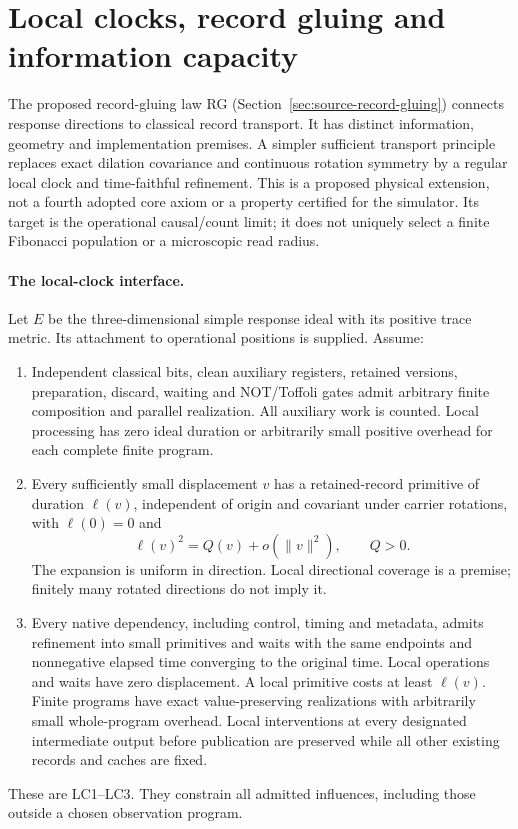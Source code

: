 \section{Local clocks, record gluing and information capacity}
\label{app:record-gluing-principle}

The proposed record-gluing law RG (Section~\ref{sec:source-record-gluing})
connects response directions to classical record transport. It has distinct information, geometry and implementation
premises. A simpler sufficient transport principle replaces exact dilation
covariance and continuous rotation symmetry by a regular local clock and
time-faithful refinement. This is a proposed physical extension, not a fourth
adopted core axiom or a property certified for the simulator. Its target is
the operational causal/count limit; it does not uniquely select a finite
Fibonacci population or a microscopic read radius.

\paragraph{The local-clock interface.}
Let $E$ be the three-dimensional simple response ideal with its positive
trace metric. Its attachment to operational positions is supplied. Assume:
\begin{enumerate}
\item Independent classical bits, clean auxiliary registers, retained
versions, preparation, discard, waiting and NOT/Toffoli gates admit
arbitrary finite composition and parallel realization. All auxiliary work
is counted. Local processing has zero ideal duration or arbitrarily small
positive overhead for each complete finite program.
\item Every sufficiently small displacement $v$ has a retained-record
primitive of duration $\ell(v)$, independent of origin and covariant under
carrier rotations, with $\ell(0)=0$ and
\[
  \ell(v)^2=Q(v)+o(\|v\|^2),\qquad Q>0.
\]
The expansion is uniform in direction. Local directional coverage is a
premise; finitely many rotated directions do not imply it.
\item Every native dependency, including control, timing and metadata,
admits refinement into small primitives and waits with the same endpoints
and nonnegative elapsed time converging to the original time. Local operations
and waits have zero displacement. A local primitive costs
at least $\ell(v)$. Finite programs have exact value-preserving realizations
with arbitrarily small whole-program overhead. Local interventions at every
designated intermediate output before publication are preserved while all
other existing records and caches are fixed.
\end{enumerate}
These are LC1--LC3. They constrain all admitted influences, including those
outside a chosen observation program.

